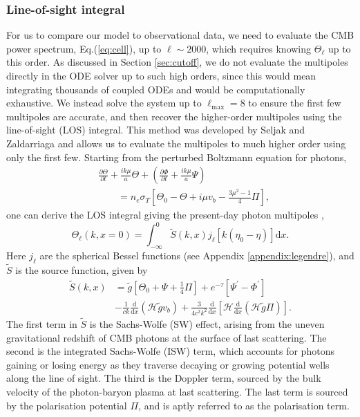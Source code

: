 \documentclass[twocolumn]{aa}
\renewcommand{\d}{\text{d}}
\newcommand{\dd}[2]{\frac{\d #1}{\d #2}}
\begin{document}
\subsubsection{Line-of-sight integral}
\label{sec:LOS}
For us to compare our model to observational data, we need to evaluate the CMB power spectrum, Eq.(\ref{eq:cell}), up to $\ell\sim2000$, which requires knowing $\Theta_\ell$ up to this order. As discussed in Section \ref{sec:cutoff}, we do not evaluate the multipoles directly in the ODE solver up to such high orders, since this would mean integrating thousands of coupled ODEs and would be computationally exhaustive. We instead solve the system up to $\ell_\text{max}=8$ to ensure the first few multipoles are accurate, and then recover the higher-order multipoles using the line-of-sight (LOS) integral. This method was developed by Seljak and Zaldarriaga \citep{LOS_integration} and allows us to evaluate the multipoles to much higher order using only the first few. Starting from the perturbed Boltzmann equation for photons,
\begin{align*}
      &\frac{\partial \Theta}{\partial t} + \frac{ik\mu}{a} \Theta + \left(\frac{\partial \Phi}{\partial t} + \frac{i k\mu}{a}\Psi\right) \\
      &\quad\quad= n_e \sigma_T\left[\Theta_0 - \Theta + i\mu v_b - \frac{3\mu^2-1}{4}\Pi\right],
\end{align*}
one can derive the LOS integral giving the present-day photon multipoles \citep{winther_lectures},
\begin{equation*}
      \Theta_\ell(k, x=0) = \int_{-\infty}^{0} \tilde{S}(k,x) j_\ell[k(\eta_0-\eta)] \d x.
\end{equation*}
Here $j_\ell$ are the spherical Bessel functions (see Appendix \ref{appendix:legendre}), and $\tilde{S}$ is the source function, given by
\begin{align*}
      \tilde{S}(k,x) &= \tilde{g}\left[ \Theta_0 + \Psi + \frac{1}{4}\Pi\right] + e^{-\tau} \left[\Psi^\prime-\Phi^\prime\right] \\ 
      &-\frac{1}{ck}\dd{}{x}(\mathcal{H}\tilde{g}v_b) + \frac{3}{4c^2k^2} \dd{}{x}
\left[\mathcal{H}\dd{}{x} (\mathcal{H}\tilde{g}\Pi)\right].
\end{align*}
The first term in $\tilde{S}$ is the Sachs-Wolfe (SW) effect, arising from the uneven gravitational redshift of CMB photons at the surface of last scattering. The second is the integrated Sachs-Wolfe (ISW) term, which accounts for photons gaining or losing energy as they traverse decaying or growing potential wells along the line of sight. The third is the Doppler term, sourced by the bulk velocity of the photon-baryon plasma at last scattering. The last term is sourced by the polarisation potential $\Pi$, and is aptly referred to as the polarisation term.
\end{document}
